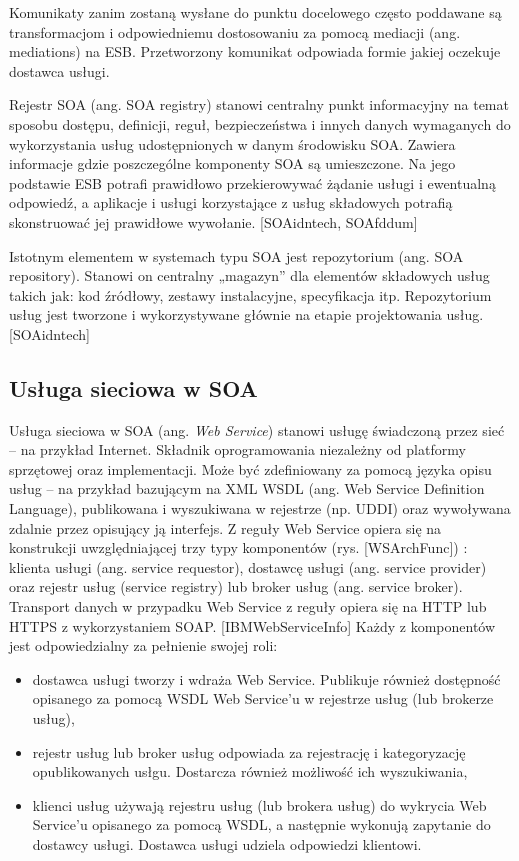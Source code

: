 Komunikaty zanim zostaną wysłane do punktu docelowego często poddawane są transformacjom i odpowiedniemu dostosowaniu za pomocą mediacji (ang. mediations) na ESB. Przetworzony komunikat odpowiada formie jakiej oczekuje dostawca usługi.
	
Rejestr SOA (ang. SOA registry) stanowi centralny punkt informacyjny na temat sposobu dostępu, definicji, reguł, bezpieczeństwa i innych danych wymaganych do wykorzystania usług udostępnionych w danym środowisku SOA. Zawiera informacje gdzie poszczególne komponenty SOA są umieszczone. Na jego podstawie ESB potrafi prawidłowo przekierowywać żądanie usługi i ewentualną odpowiedź, a aplikacje i usługi korzystające z usług składowych potrafią skonstruować jej prawidłowe wywołanie. [SOAidntech, SOAfddum]
	
Istotnym elementem w systemach typu SOA jest repozytorium (ang. SOA repository). Stanowi on centralny „magazyn” dla elementów składowych usług takich jak: kod źródłowy, zestawy instalacyjne, specyfikacja itp. Repozytorium usług jest tworzone i wykorzystywane głównie na etapie projektowania usług. [SOAidntech]

\subsection{Usługa sieciowa w SOA}
Usługa sieciowa w SOA (ang. \textit{Web Service}) stanowi usługę świadczoną przez sieć – na przykład Internet. Składnik oprogramowania niezależny od platformy sprzętowej oraz implementacji. Może być zdefiniowany za pomocą języka opisu usług – na przykład bazującym na XML WSDL (ang. Web Service Definition Language), publikowana i wyszukiwana w rejestrze (np. UDDI) oraz wywoływana zdalnie przez opisujący ją interfejs. 
Z reguły Web Service opiera się na konstrukcji uwzględniającej trzy typy komponentów (rys. [WSArchFunc]) : klienta usługi (ang. service requestor), dostawcę usługi (ang. service provider) oraz rejestr usług (service registry) lub broker usług (ang. service broker).  Transport danych w przypadku Web Service z reguły opiera się na HTTP lub HTTPS z wykorzystaniem SOAP. [IBMWebServiceInfo]
Każdy z komponentów jest odpowiedzialny za pełnienie swojej roli:
\begin{itemize}
\item{dostawca usługi tworzy i wdraża Web Service. Publikuje również dostępność opisanego za pomocą WSDL Web Service’u w rejestrze usług (lub brokerze usług),}
\item{rejestr usług lub broker usług odpowiada za rejestrację i kategoryzację opublikowanych usłgu. Dostarcza również możliwość ich wyszukiwania,} 
\item{klienci usług używają rejestru usług (lub brokera usług) do wykrycia Web Service’u opisanego za pomocą WSDL, a następnie wykonują zapytanie do dostawcy usługi. Dostawca usługi udziela odpowiedzi klientowi.}
\end{itemize}

